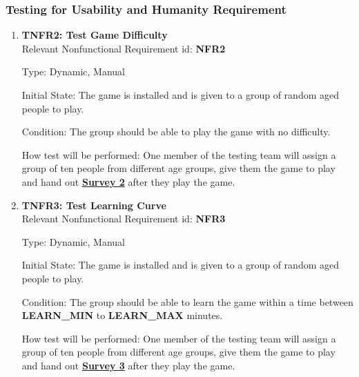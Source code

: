 \documentclass[12pt, titlepage]{article}
\begin{document}
\subsubsection{Testing for Usability and Humanity Requirement}
\begin{enumerate}

\item{\textbf{TNFR2: Test Game Difficulty \\}}
Relevant Nonfunctional Requirement id: \textbf{NFR2}

Type: Dynamic, Manual

Initial State: The game is installed and is given to a group of random aged people to play.

Condition: The group should be able to play the game with no difficulty.

How test will be performed: One member of the testing team will assign a group of ten people from different age groups, give them the game to play and hand out \hyperref[s2]{\bf Survey 2} after they play the game.

\item{\textbf{TNFR3: Test Learning Curve \\}}
Relevant Nonfunctional Requirement id: \textbf{NFR3}

Type: Dynamic, Manual

Initial State: The game is installed and is given to a group of random aged people to play.

Condition: The group should be able to learn the game within a time between \textbf{LEARN\_MIN} to \textbf{LEARN\_MAX} minutes.

How test will be performed: One member of the testing team will assign a group of ten people from different age groups, give them the game to play and hand out \hyperref[s3]{\bf Survey 3} after they play the game.
\end{enumerate}
\end{document}
